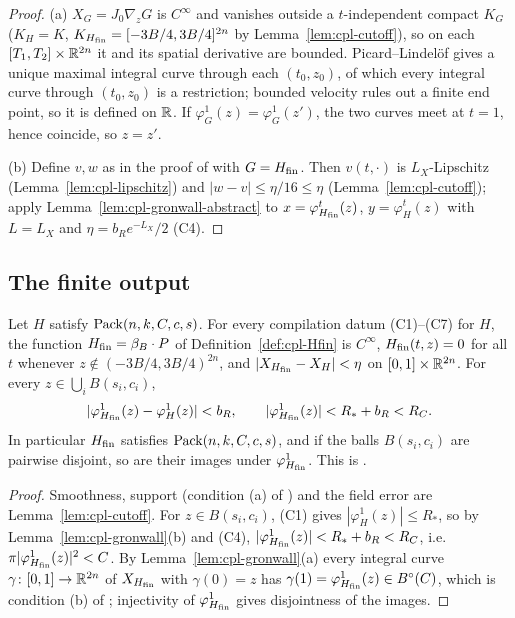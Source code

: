 \begin{proof}
(a) $X_G=J_0\nabla_zG$ is $C^\infty$ and vanishes outside a $t$-independent compact $K_G$ ($K_H=K$,
$K_{H_{\mathrm{fin}}}=[-3B/4,3B/4]^{2n}$ by Lemma~\ref{lem:cpl-cutoff}), so on each $[T_1,T_2]\times\mathbb{R}^{2n}$ it and its spatial
derivative are bounded. Picard--Lindel\"of gives a unique maximal integral curve through each $(t_0,z_0)$, of which
every integral curve through $(t_0,z_0)$ is a restriction; bounded velocity rules out a finite end point, so it is
defined on $\mathbb{R}$. If $\varphi^1_G(z)=\varphi^1_G(z')$, the two curves meet at $t=1$, hence coincide, so $z=z'$.

(b) Define $v,w$ as in the proof of  with $G=H_{\mathrm{fin}}$. Then $v(t,\cdot)$ is
$L_X$-Lipschitz (Lemma~\ref{lem:cpl-lipschitz}) and $|w-v|\le\eta/16\le\eta$ (Lemma~\ref{lem:cpl-cutoff}); apply
Lemma~\ref{lem:cpl-gronwall-abstract} to $x=\varphi^t_{H_{\mathrm{fin}}}(z)$, $y=\varphi^t_H(z)$ with $L=L_X$ and
$\eta=b_Re^{-L_X}/2$ (C4).
\end{proof}

\subsection{The finite output}\label{sec:cpl-final}

\begin{theorem}\label{thm:cpl-final}
Let $H$ satisfy $\mathrm{Pack}(n,k,C,c,s)$. For every compilation datum (C1)--(C7) for $H$, the function
$H_{\mathrm{fin}}=\beta_B\cdot P$ of Definition~\ref{def:cpl-Hfin} is $C^\infty$, $H_{\mathrm{fin}}(t,z)=0$ for all $t$ whenever
$z\notin(-3B/4,3B/4)^{2n}$, and $|X_{H_{\mathrm{fin}}}-X_H|<\eta$ on $[0,1]\times\mathbb{R}^{2n}$. For every $z\in\bigcup_iB(s_i,c_i)$,
\[
 |\varphi^1_{H_{\mathrm{fin}}}(z)-\varphi^1_H(z)|<b_R,\qquad |\varphi^1_{H_{\mathrm{fin}}}(z)|<R_*+b_R<R_C .
\]
In particular $H_{\mathrm{fin}}$ satisfies $\mathrm{Pack}(n,k,C,c,s)$, and if the balls $B(s_i,c_i)$ are pairwise disjoint, so are
their images under $\varphi^1_{H_{\mathrm{fin}}}$. This is .
\end{theorem}

\begin{proof}
Smoothness, support (condition (a) of ) and the field error are
Lemma~\ref{lem:cpl-cutoff}. For $z\in B(s_i,c_i)$, (C1) gives $|\varphi^1_H(z)|\le R_*$, so by
Lemma~\ref{lem:cpl-gronwall}(b) and (C4), $|\varphi^1_{H_{\mathrm{fin}}}(z)|<R_*+b_R<R_C$, i.e.\ $\pi|\varphi^1_{H_{\mathrm{fin}}}(z)|^2<C$.
By Lemma~\ref{lem:cpl-gronwall}(a) every integral curve $\gamma\colon[0,1]\to\mathbb{R}^{2n}$ of $X_{H_{\mathrm{fin}}}$ with
$\gamma(0)=z$ has $\gamma(1)=\varphi^1_{H_{\mathrm{fin}}}(z)\in B^{\circ}(C)$, which is condition (b) of
; injectivity of $\varphi^1_{H_{\mathrm{fin}}}$ gives disjointness of the images.
\end{proof}
\endgroup
